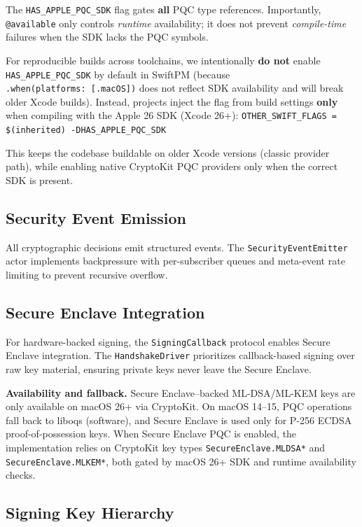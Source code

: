 \documentclass[10pt,journal,compsoc]{IEEEtran}
\begin{document}
The \texttt{HAS\_APPLE\_PQC\_SDK} flag gates \textbf{all} PQC type
references. Importantly, \texttt{@available} only controls
\emph{runtime} availability; it does not prevent \emph{compile-time}
failures when the SDK lacks the PQC symbols.

For reproducible builds across toolchains, we intentionally \textbf{do
not} enable \texttt{HAS\_APPLE\_PQC\_SDK} by default in SwiftPM (because
\texttt{.when(platforms:\ {[}.macOS{]})} does not reflect SDK
availability and will break older Xcode builds). Instead, projects
inject the flag from build settings \textbf{only} when compiling with
the Apple 26 SDK (Xcode 26+):
\texttt{OTHER\_SWIFT\_FLAGS = \allowbreak \$(inherited) \allowbreak -DHAS\_APPLE\_PQC\_SDK}

This keeps the codebase buildable on older Xcode versions (classic
provider path), while enabling native CryptoKit PQC providers only when
the correct SDK is present.

\subsection*{Security Event Emission}

All cryptographic decisions emit structured events. The
\texttt{SecurityEventEmitter} actor implements backpressure with
per-subscriber queues and meta-event rate limiting to prevent recursive
overflow.

\subsection*{Secure Enclave Integration}

For hardware-backed signing, the \texttt{SigningCallback} protocol
enables Secure Enclave integration. The \texttt{HandshakeDriver}
prioritizes callback-based signing over raw key material, ensuring
private keys never leave the Secure Enclave.

\textbf{Availability and fallback.} Secure Enclave--backed ML-DSA/ML-KEM
keys are only available on macOS 26+ via CryptoKit. On macOS 14--15, PQC
operations fall back to liboqs (software), and Secure Enclave is used
only for P-256 ECDSA proof-of-possession keys. When Secure Enclave PQC
is enabled, the implementation relies on CryptoKit key types
\texttt{SecureEnclave.\allowbreak MLDSA*} and
\texttt{SecureEnclave.\allowbreak MLKEM*}, both gated by macOS 26+ SDK
and runtime availability checks.

\subsection*{Signing Key Hierarchy}
\end{document}
